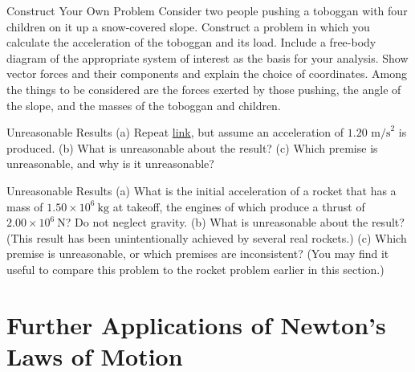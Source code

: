 \documentclass[
]{book}
\newenvironment{problems-exercises}{}{}
\newenvironment{tinysection}{}{}
\begin{document}
\begin{problems-exercises}
\begin{tinysection}
\end{tinysection}

\hypertarget{fs-id1677950}{}
\hypertarget{fs-id2341166}{}
\begin{tinysection}

{Construct Your Own Problem} Consider two people
pushing a toboggan with four children on it up a snow-covered slope.
Construct a problem in which you calculate the acceleration of the
toboggan and its load. Include a free-body diagram of the appropriate
system of interest as the basis for your analysis. Show vector forces
and their components and explain the choice of coordinates. Among the
things to be considered are the forces exerted by those pushing, the
angle of the slope, and the masses of the toboggan and children.

\end{tinysection}

\hypertarget{fs-id1325985}{}
\hypertarget{fs-id2731874}{}
\begin{tinysection}

{Unreasonable Results} (a) Repeat
\protect\hyperlink{fs-id1673888}{link}, but assume an
acceleration of \({1\text{.}\text{20\ m/s}^{2}}{}\) is produced. (b) What
is unreasonable about the result? (c) Which premise is unreasonable, and
why is it unreasonable?

\end{tinysection}

\hypertarget{fs-id1285123}{}
\hypertarget{fs-id1782779}{}
\begin{tinysection}

{Unreasonable Results} (a) What is the initial
acceleration of a rocket that has a mass of
\({1\text{.}{\text{50} \times \text{10}^{6}}\ \text{kg}}{}\) at takeoff,
the engines of which produce a thrust of
\({2\text{.}{\text{00} \times \text{10}^{6}}\ \text{N}}{}\)? Do not
neglect gravity. (b) What is unreasonable about the result? (This result
has been unintentionally achieved by several real rockets.) (c) Which
premise is unreasonable, or which premises are inconsistent? (You may
find it useful to compare this problem to the rocket problem earlier in
this section.)

\end{tinysection}

\end{problems-exercises}

\hypertarget{further-applications-of-newtons-laws-of-motion}{%
\section{Further Applications of Newton's Laws of Motion}\label{further-applications-of-newtons-laws-of-motion}}
\end{document}
